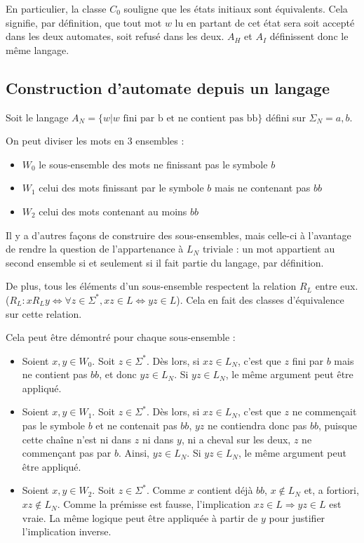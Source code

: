 En particulier, la classe $C_0$ souligne que les états initiaux sont équivalents. Cela signifie, par définition, que tout mot $w$ lu en partant de cet état sera soit accepté dans les deux automates, soit refusé dans les deux. $A_H$ et $A_I$ définissent donc le même langage.



\subsection{Construction d'automate depuis un langage}

Soit le langage $A_N = \{w | w \text{ fini par b et ne contient pas bb}\}$ défini sur $\Sigma_N = {a,b}$.

On peut diviser les mots en 3 ensembles : 

\begin{itemize}
	\item $W_0$ le sous-ensemble des mots ne finissant pas le symbole $b$
	\item $W_1$ celui des mots finissant par le symbole $b$ mais ne contenant pas $bb$
	\item $W_2$ celui des mots contenant au moins $bb$
\end{itemize}

Il y a d'autres façons de construire des sous-ensembles, mais celle-ci à l'avantage de rendre la question de l'appartenance à $L_N$ triviale : un mot appartient au second ensemble si et seulement si il fait partie du langage, par définition.

De plus, tous les éléments d'un sous-ensemble respectent la relation $R_L$ entre eux. ($R_L : xR_Ly \Leftrightarrow \forall z \in \Sigma^*, xz \in L \Leftrightarrow yz \in L$). Cela en fait des classes d'équivalence sur cette relation.

Cela peut être démontré pour chaque sous-ensemble :
\begin{itemize}
	\item Soient $x,y \in W_0$. Soit $z \in \Sigma^*$. Dès lors, si $xz \in L_N$, c'est que $z$ fini par $b$ mais ne contient pas $bb$, et donc $yz \in L_N$. Si $yz \in L_N$, le même argument peut être appliqué.
	\item Soient $x,y \in W_1$. Soit $z \in \Sigma^*$. Dès lors, si $xz \in L_N$, c'est que $z$ ne commençait pas le symbole $b$ et ne contenait pas $bb$, $yz$ ne contiendra donc pas $bb$, puisque cette chaîne n'est ni dans $z$ ni dans $y$, ni a cheval sur les deux, $z$ ne commençant pas par $b$. Ainsi, $yz \in L_N$. Si $yz \in L_N$, le même argument peut être appliqué.
	\item Soient $x,y \in W_2$. Soit $z \in \Sigma^*$. Comme $x$ contient déjà $bb$, $x \notin L_N$ et, a fortiori, $xz \notin L_N$. Comme la prémisse est fausse, l'implication $xz \in L \Rightarrow yz \in L$ est vraie. La même logique peut être appliquée à partir de $y$ pour justifier l'implication inverse.
\end{itemize}

